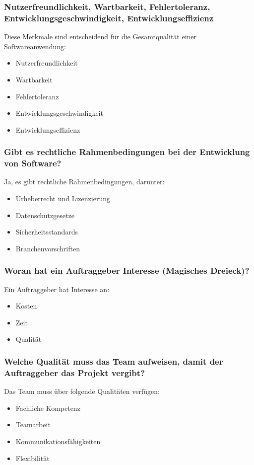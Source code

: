 \documentclass[main.tex]{subfiles}
\begin{document}
\subsubsection*{Nutzerfreundlichkeit, Wartbarkeit, Fehlertoleranz, Entwicklungsgeschwindigkeit, Entwicklungseffizienz}
Diese Merkmale sind entscheidend für die Gesamtqualität einer Softwareanwendung:
\begin{itemize}
    \item Nutzerfreundlichkeit
    \item Wartbarkeit
    \item Fehlertoleranz
    \item Entwicklungsgeschwindigkeit
    \item Entwicklungseffizienz
\end{itemize}



\subsubsection*{Gibt es rechtliche Rahmenbedingungen bei der Entwicklung von Software?}
Ja, es gibt rechtliche Rahmenbedingungen, darunter:
\begin{itemize}
    \item Urheberrecht und Lizenzierung
    \item Datenschutzgesetze
    \item Sicherheitsstandards
    \item Branchenvorschriften
\end{itemize}


\subsubsection*{Woran hat ein Auftraggeber Interesse (\gls{Magisches Dreieck})?}
Ein Auftraggeber hat Interesse an:
\begin{itemize}
    \item Kosten
    \item Zeit
    \item Qualität
\end{itemize}


\subsubsection*{Welche Qualität muss das Team aufweisen, damit der Auftraggeber das Projekt vergibt?}
Das Team muss über folgende Qualitäten verfügen:
\begin{itemize}
    \item Fachliche Kompetenz
    \item Teamarbeit
    \item Kommunikationsfähigkeiten
    \item Flexibilität
\end{itemize}
\end{document}
